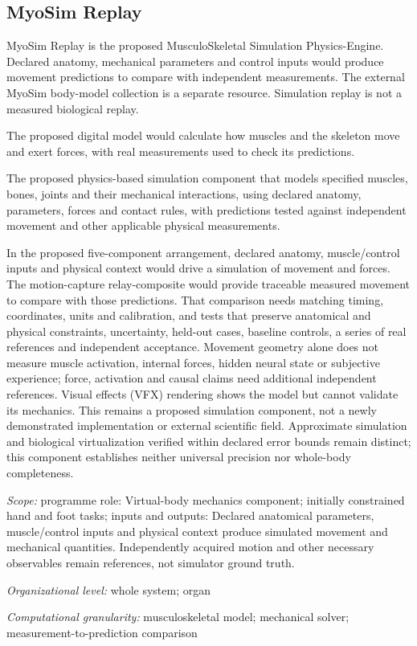 \begin{samepage}
\subsection*{MyoSim Replay}
\noindent MyoSim Replay is the proposed MusculoSkeletal Simulation Physics-Engine. Declared anatomy, mechanical parameters and control inputs would produce movement predictions to compare with independent measurements. The external MyoSim body-model collection is a separate resource. Simulation replay is not a measured biological replay.\par
\noindent The proposed digital model would calculate how muscles and the skeleton move and exert forces, with real measurements used to check its predictions.\par
\end{samepage}
\noindent The proposed physics-based simulation component that models specified muscles, bones, joints and their mechanical interactions, using declared anatomy, parameters, forces and contact rules, with predictions tested against independent movement and other applicable physical measurements.\par
\noindent In the proposed five-component arrangement, declared anatomy, muscle/control inputs and physical context would drive a simulation of movement and forces. The motion-capture relay-composite would provide traceable measured movement to compare with those predictions. That comparison needs matching timing, coordinates, units and calibration, and tests that preserve anatomical and physical constraints, uncertainty, held-out cases, baseline controls, a series of real references and independent acceptance. Movement geometry alone does not measure muscle activation, internal forces, hidden neural state or subjective experience; force, activation and causal claims need additional independent references. Visual effects (VFX) rendering shows the model but cannot validate its mechanics. This remains a proposed simulation component, not a newly demonstrated implementation or external scientific field. Approximate simulation and biological virtualization verified within declared error bounds remain distinct; this component establishes neither universal precision nor whole-body completeness.\par
\noindent\textit{Scope:} programme role: Virtual-body mechanics component; initially constrained hand and foot tasks; inputs and outputs: Declared anatomical parameters, muscle/control inputs and physical context produce simulated movement and mechanical quantities. Independently acquired motion and other necessary observables remain references, not simulator ground truth.\par
\noindent\textit{Organizational level:} whole system; organ\par
\begin{samepage}
\noindent\textit{Computational granularity:} musculoskeletal model; mechanical solver; measurement-to-prediction comparison\par\nopagebreak[4]

\end{samepage}


